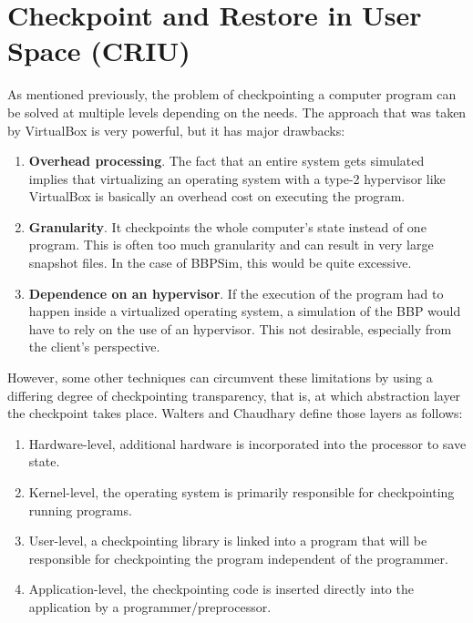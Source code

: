 \section{Checkpoint and Restore in User Space (CRIU)}\label{sec:criu}
As mentioned previously, the problem of checkpointing a computer program can be solved at multiple levels depending on the needs. The approach that was taken by VirtualBox is very powerful, but it has major drawbacks:
\begin{enumerate}
	\item \textbf{Overhead processing}. The fact that an entire system gets simulated implies that virtualizing an operating system with a type-2 hypervisor like VirtualBox is basically an overhead cost on executing the program. 
	\item \textbf{Granularity}. It checkpoints the whole computer's state instead of one program. This is often too much granularity and can result in very large snapshot files. In the case of \gls{BBPSim}, this would be quite excessive.
	\item \textbf{Dependence on an hypervisor}. If the execution of the program had to happen inside a virtualized operating system, a simulation of the \gls{BBP} would have to rely on the use of an hypervisor. This not desirable, especially from the client's perspective.
\end{enumerate}

However, some other techniques can circumvent these limitations by using a differing degree of checkpointing transparency, that is, at which abstraction layer the checkpoint takes place. Walters and Chaudhary define those layers as follows: 
\begin{shadedquotation}
\begin{enumerate}
	\item Hardware-level, additional hardware is incorporated into the processor to
save state.
	\item Kernel-level, the operating system is primarily responsible for checkpointing
running programs.
	\item User-level, a checkpointing library is linked into a program that will be responsible for checkpointing the program independent of the programmer.
	\item Application-level, the checkpointing code is inserted directly into the application by a programmer/preprocessor.
\end{enumerate}
\cite{paper:app-level-chkpt}
\end{shadedquotation}

